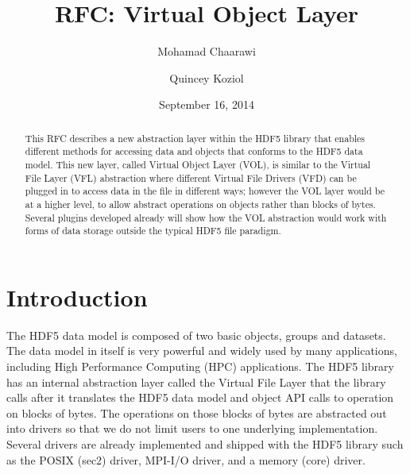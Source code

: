 \documentclass[letterpaper,hyper]{THG_RFC}
\title{RFC: Virtual Object Layer}
\author{Mohamad Chaarawi}
\author{Quincey Koziol}
\date{September 16, 2014}
\begin{document}
\maketitle

\begin{abstract}
This RFC describes a new abstraction layer within the HDF5 library that enables different methods for accessing data and objects that conforms to the HDF5 data model. This new layer, called Virtual Object Layer (VOL), is similar to the Virtual File Layer (VFL) abstraction where different Virtual File Drivers (VFD) can be plugged in to access data in the file in different ways; however the VOL layer would be at a higher level, to allow abstract operations on objects rather than blocks of bytes. Several plugins developed already will show how the VOL abstraction would work with forms of data storage outside the typical HDF5 file paradigm.
\end{abstract}

\section{Introduction}
The HDF5 data model is composed of two basic objects, groups and datasets. The data model in itself is very powerful and widely used by many applications, including High Performance Computing (HPC) applications. The HDF5 library has an internal abstraction layer called the Virtual File Layer that the library calls after it translates the HDF5 data model and object API calls to operation on blocks of bytes. The operations on those blocks of bytes are abstracted out into drivers so that we do not limit users to one underlying implementation. Several drivers are already implemented and shipped with the HDF5 library such as the POSIX (sec2) driver, MPI-I/O driver, and a memory (core) driver.
\end{document}
